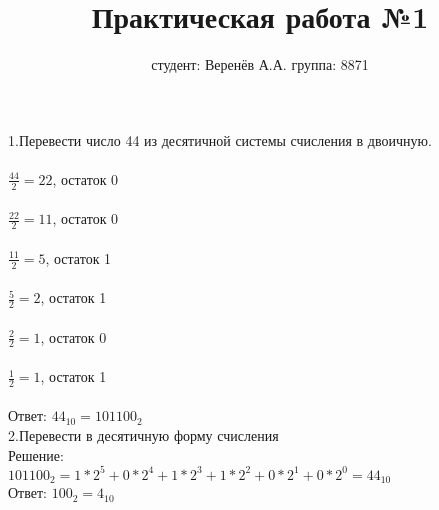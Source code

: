 \documentclass[a4paper,11pt]{article}
\title{Практическая работа №1}
\author{студент: Веренёв А.А. группа: 8871}
\begin{document}
\maketitle
1.Перевести число 44 из десятичной системы счисления в двоичную.\\
\\
$\frac{44}{2}=22$, остаток 0\\
\\
$\frac{22}{2}=11$, остаток 0\\
\\
$\frac{11}{2}=5$, остаток 1\\
\\
$\frac{5}{2}=2$, остаток 1\\
\\
$\frac{2}{2}=1$, остаток 0\\
\\
$\frac{1}{2}=1$, остаток 1\\
\\
Ответ: $44_{10}=101100_2$\\

2.Перевести в десятичную форму счисления
\\
Решение:\\
$101100_2=1*2^5+0*2^4+1*2^3+1*2^2+0*2^1+0*2^0=44_{10}$
\\
Ответ: $100_2=4_{10}$
\end{document}
